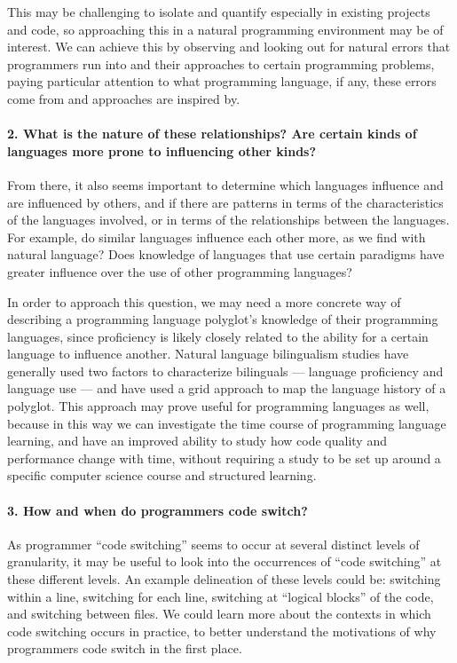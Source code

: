\documentclass[a4paper,UKenglish,cleveref, autoref]{oasics-v2019}
\begin{document}
This may be challenging to isolate and quantify especially in existing projects and code, so approaching this in a natural programming environment may be of interest. We can achieve this by observing and looking out for natural errors that programmers run into and their approaches to certain programming problems, paying particular attention to what programming language, if any, these errors come from and approaches are inspired by.
\paragraph*{2. What is the nature of these relationships? Are certain kinds of languages more prone to influencing other kinds?} 

From there, it also seems important to determine which languages influence and are influenced by others, and if there are patterns in terms of the characteristics of the languages involved, or in terms of the relationships between the languages. For example, do similar languages influence each other more, as we find with natural language? Does knowledge of languages that use certain paradigms have greater influence over the use of other programming languages? 

In order to approach this question, we may need a more concrete way of describing a programming language polyglot’s knowledge of their programming languages, since proficiency is likely closely related to the ability for a certain language to influence another. Natural language bilingualism studies have generally used two factors to characterize bilinguals — language proficiency and language use — and have used a grid approach to map the language history of a polyglot. This approach may prove useful for programming languages as well, because in this way we can investigate the time course of programming language learning, and have an improved ability to study how code quality and performance change with time, without requiring a study to be set up around a specific computer science course and structured learning. 
\paragraph*{3. How and when do programmers code switch?}

As programmer “code switching” seems to occur at several distinct levels of granularity, it may be useful to look into the occurrences of “code switching” at these different levels. An example delineation of these levels could be: switching within a line, switching for each line, switching at “logical blocks” of the code, and switching between files. We could learn more about the contexts in which code switching occurs in practice, to better understand the motivations of why programmers code switch in the first place. 
\end{document}
